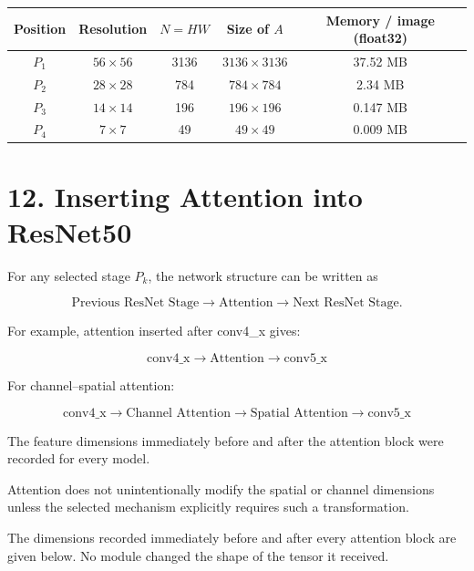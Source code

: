\documentclass[10pt]{article}
\begin{document}
\begin{center}
\begin{tabular}{|c|c|c|c|c|}
\hline
\textbf{Position} & \textbf{Resolution} & $N=HW$ & \textbf{Size of $A$} & \textbf{Memory / image (float32)}\\
\hline
$P_1$ & $56\times56$ & 3136 & $3136\times3136$ & 37.52 MB\\
$P_2$ & $28\times28$ & 784 & $784\times784$ & 2.34 MB\\
$P_3$ & $14\times14$ & 196 & $196\times196$ & 0.147 MB\\
$P_4$ & $7\times7$ & 49 & $49\times49$ & 0.009 MB\\
\hline
\end{tabular}
\end{center}

\section*{12. Inserting Attention into ResNet50}

For any selected stage $P_k$, the network structure can be written as

\[
\text{Previous ResNet Stage}
\rightarrow
\text{Attention}
\rightarrow
\text{Next ResNet Stage}.
\]

For example, attention inserted after conv4\_x gives:

\[
\boxed{
\text{conv4\_x}
\rightarrow
\text{Attention}
\rightarrow
\text{conv5\_x}
}
\]

For channel--spatial attention:

\[
\boxed{
\text{conv4\_x}
\rightarrow
\text{Channel Attention}
\rightarrow
\text{Spatial Attention}
\rightarrow
\text{conv5\_x}
}
\]

The feature dimensions immediately before and after
the attention block were recorded for every model.

Attention does not unintentionally modify the spatial or channel
dimensions unless the selected mechanism explicitly requires such a
transformation.

The dimensions recorded immediately before and after every attention block are
given below. No module changed the shape of the tensor it received.
\end{document}
